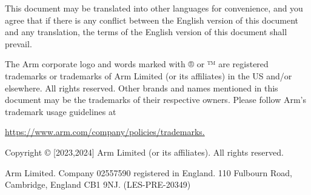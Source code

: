 This document may be translated into other languages for convenience, and you
agree that if there is any conflict between the English version of this
document and any translation, the terms of the English version of this document
shall prevail.

The Arm corporate logo and words marked with ® or ™ are registered trademarks
or trademarks of Arm Limited (or its affiliates) in the US and/or elsewhere.
All rights reserved.  Other brands and names mentioned in this document may be
the trademarks of their respective owners. Please follow Arm’s trademark usage
guidelines at

\url{https://www.arm.com/company/policies/trademarks.}

Copyright © [2023,2024] Arm Limited (or its affiliates). All rights reserved.

Arm Limited. Company 02557590 registered in England.  110 Fulbourn Road,
Cambridge, England CB1 9NJ.  (LES-PRE-20349)
